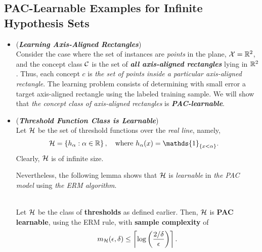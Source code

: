 \documentclass[11pt]{article}
\begin{document}
\subsection{PAC-Learnable Examples for Infinite Hypothesis Sets}
\begin{itemize}
\item \begin{example} (\emph{\textbf{Learning Axis-Aligned Rectangles}}) \citep{mohri2018foundations}\\
Consider the case where the set of instances are \emph{points} in the plane, ${\mathcal X} = {\mathbb R}^2$, and the concept class ${\mathcal C}$ is the set of \emph{\textbf{all axis-aligned rectangles}} lying in ${\mathbb R}^2$. Thus, each concept $c$ is \emph{the set of points inside a particular axis-aligned rectangle}. The learning
problem consists of determining with small error a target axis-aligned rectangle using the labeled training sample. We will show that \emph{the concept class of axis-aligned rectangles} is \emph{\textbf{PAC-learnable}}.
\end{example}



\item \begin{example} (\emph{\textbf{Threshold Function Class is Learnable}}) \citep{shalev2014understanding, mohri2018foundations}\\
Let ${\mathcal H}$ be the set of threshold functions over the \emph{real line}, namely,
\begin{align*}
\cH &= \set{h_{\alpha}: \alpha \in \bR}, \quad\text{where } h_{\alpha}(x) = \mathds{1}_{\set{x<\alpha}}.
\end{align*}
Clearly, ${\mathcal H}$ is of infinite size.

Nevertheless, the following lemma shows that ${\mathcal H}$ is \emph{learnable} in \emph{the PAC model} using \emph{the ERM algorithm}.

\begin{lemma}\citep{shalev2014understanding}\\
Let ${\mathcal H}$ be the class of \textbf{thresholds} as defined earlier. Then, ${\mathcal H}$ is \textbf{PAC learnable}, using the ERM rule, with \textbf{sample complexity} of
\begin{align*}
m_{{\mathcal H}}(\epsilon, \delta) \le \left\lceil \log\left(\frac{2/\delta}{\epsilon}\right) \right\rceil.
\end{align*}
\end{lemma}

\end{example}
\end{itemize}
\end{document}
